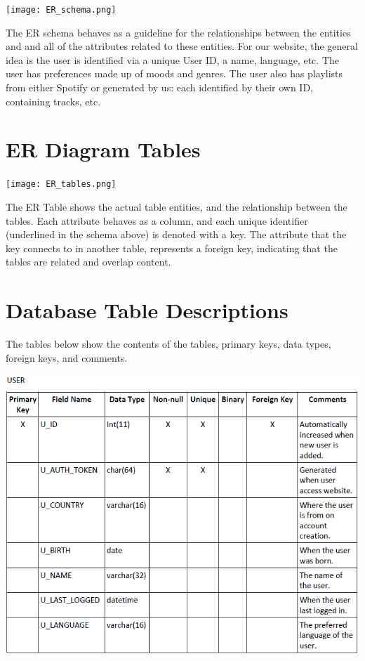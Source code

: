 \documentclass[letter, 11pt]{article}
\begin{document}
\texttt{[image: ER\_schema.png]}

The ER schema behaves as a guideline for the relationships between the entities and and all of the attributes related to these entities. For our website, the general idea is the user is identified via a unique User ID, a name, language, etc. The user has preferences made up of moods and genres. The user also has playlists from either Spotify or generated by us: each identified by their own ID, containing tracks, etc.

\section*{ER Diagram Tables}

\texttt{[image: ER\_tables.png]}

The ER Table shows the actual table entities, and the relationship between the tables. Each attribute behaves as a column, and each unique identifier (underlined in the schema above) is denoted with a key. The attribute that the key connects to in another table, represents a foreign key, indicating that the tables are related and overlap content.

\pagebreak

\section*{Database Table Descriptions}

The tables below show the contents of the tables, primary keys, data types, foreign keys, and comments.

\includegraphics[scale=0.85,left]{er_tables/user.PNG}
\end{document}
